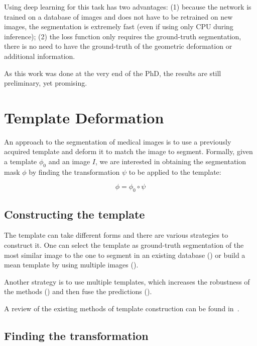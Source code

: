 Using deep learning for this task has two advantages: (1) because the network is trained on a database of images and does not have to be retrained on new images, the segmentation is extremely fast (even if using only CPU during inference); (2) the loss function only requires the ground-truth segmentation, there is no need to have the ground-truth of the geometric deformation or additional information.

As this work was done at the very end of the PhD, the results are still preliminary, yet promising.

\section{Template Deformation}
\label{sec:seg_biblio}

An approach to the segmentation of medical images is to use a previously acquired template and deform it to match the image to segment. Formally, given a template $\phi_0$ and an image $I$, we are interested in obtaining the segmentation mask $\phi$ by finding the transformation $\psi$ to be applied to the template:

\begin{equation}
    \phi = \phi_0 \circ \psi %
\end{equation}

\subsection{Constructing the template}

The template can take different forms and there are various strategies to construct it. One can select the template as ground-truth segmentation of the most similar image to the one to segment in an existing database (\textcite{commowick2007MICCAI}) or build a mean template by using multiple images (\textcite{joshi2004}).

Another strategy is to use multiple templates, which increases the robustness of the methods (\textcite{heckemann2006}) and then fuse the predictions (\textcite{warfield2004}). 

A review of the existing methods of template construction can be found in\-~\textcite{cabezas2011}.

\subsection{Finding the transformation}

